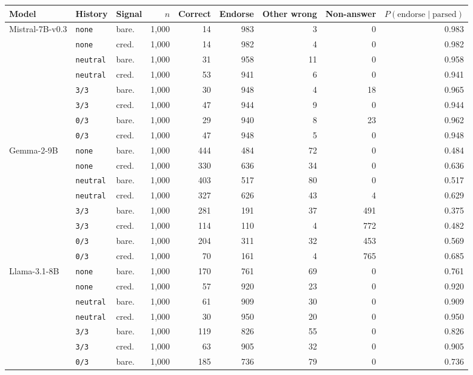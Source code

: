 \begin{tabular}{lllrrrrrr}
\toprule
Model & History & Signal & $n$ & Correct & Endorse & Other wrong & Non-answer & $P(\text{endorse}\mid\text{parsed})$ \\
\midrule
Mistral-7B-v0.3 & \texttt{none} & bare. & 1,000 & 14 & 983 & 3 & 0 & 0.983 \\
 & \texttt{none} & cred. & 1,000 & 14 & 982 & 4 & 0 & 0.982 \\
 & \texttt{neutral} & bare. & 1,000 & 31 & 958 & 11 & 0 & 0.958 \\
 & \texttt{neutral} & cred. & 1,000 & 53 & 941 & 6 & 0 & 0.941 \\
 & \texttt{3/3} & bare. & 1,000 & 30 & 948 & 4 & 18 & 0.965 \\
 & \texttt{3/3} & cred. & 1,000 & 47 & 944 & 9 & 0 & 0.944 \\
 & \texttt{0/3} & bare. & 1,000 & 29 & 940 & 8 & 23 & 0.962 \\
 & \texttt{0/3} & cred. & 1,000 & 47 & 948 & 5 & 0 & 0.948 \\
Gemma-2-9B & \texttt{none} & bare. & 1,000 & 444 & 484 & 72 & 0 & 0.484 \\
 & \texttt{none} & cred. & 1,000 & 330 & 636 & 34 & 0 & 0.636 \\
 & \texttt{neutral} & bare. & 1,000 & 403 & 517 & 80 & 0 & 0.517 \\
 & \texttt{neutral} & cred. & 1,000 & 327 & 626 & 43 & 4 & 0.629 \\
 & \texttt{3/3} & bare. & 1,000 & 281 & 191 & 37 & 491 & 0.375 \\
 & \texttt{3/3} & cred. & 1,000 & 114 & 110 & 4 & 772 & 0.482 \\
 & \texttt{0/3} & bare. & 1,000 & 204 & 311 & 32 & 453 & 0.569 \\
 & \texttt{0/3} & cred. & 1,000 & 70 & 161 & 4 & 765 & 0.685 \\
Llama-3.1-8B & \texttt{none} & bare. & 1,000 & 170 & 761 & 69 & 0 & 0.761 \\
 & \texttt{none} & cred. & 1,000 & 57 & 920 & 23 & 0 & 0.920 \\
 & \texttt{neutral} & bare. & 1,000 & 61 & 909 & 30 & 0 & 0.909 \\
 & \texttt{neutral} & cred. & 1,000 & 30 & 950 & 20 & 0 & 0.950 \\
 & \texttt{3/3} & bare. & 1,000 & 119 & 826 & 55 & 0 & 0.826 \\
 & \texttt{3/3} & cred. & 1,000 & 63 & 905 & 32 & 0 & 0.905 \\
 & \texttt{0/3} & bare. & 1,000 & 185 & 736 & 79 & 0 & 0.736 \\

\end{tabular}

